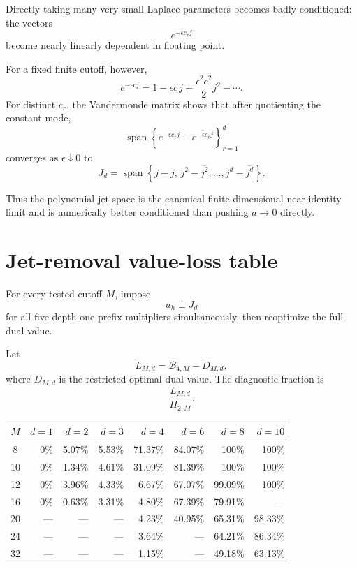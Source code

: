 \documentclass[11pt,a4paper]{article}
\newcommand{\Bcal}{\mathcal B}
\begin{document}
Directly taking many very small Laplace parameters becomes badly conditioned:
the vectors
\[
e^{-\epsilon c_r j}
\]
become nearly linearly dependent in floating point.

For a fixed finite cutoff, however,
\[
e^{-\epsilon c j}
=
1
-\epsilon c\,j
+\frac{\epsilon^2c^2}{2}j^2
-\cdots.
\]
For distinct \(c_r\), the Vandermonde matrix shows that after quotienting the
constant mode,
\[
\operatorname{span}
\left\{
e^{-\epsilon c_rj}-\overline{e^{-\epsilon c_rj}}
\right\}_{r=1}^d
\]
converges as \(\epsilon\downarrow0\) to
\[
\boxed{
J_d
=
\operatorname{span}
\left\{
j-\overline j,\,
j^2-\overline{j^2},\ldots,
j^d-\overline{j^d}
\right\}.
}
\tag{32}
\]

Thus the polynomial jet space is the canonical finite-dimensional
near-identity limit and is numerically better conditioned than pushing
\(a\to0\) directly.

\section{Jet-removal value-loss table}

For every tested cutoff \(M\), impose
\[
u_h\perp J_d
\]
for all five depth-one prefix multipliers simultaneously, then reoptimize the
full dual value.

Let
\[
L_{M,d}
=
\Bcal_{4,M}
-
D_{M,d},
\]
where \(D_{M,d}\) is the restricted optimal dual value.
The diagnostic fraction is
\[
\frac{L_{M,d}}{\Pi_{2,M}}.
\]

\begin{center}
\small
\begin{tabular}{c|rrrrrrr}
\toprule
\(M\) & \(d=1\) & \(d=2\) & \(d=3\) & \(d=4\) & \(d=6\) & \(d=8\) & \(d=10\)\\
\midrule
8  & 0\% & 5.07\% & 5.53\% & 71.37\% & 84.07\% & 100\% & 100\%\\
10 & 0\% & 1.34\% & 4.61\% & 31.09\% & 81.39\% & 100\% & 100\%\\
12 & 0\% & 3.96\% & 4.33\% & 6.67\% & 67.07\% & 99.09\% & 100\%\\
16 & 0\% & 0.63\% & 3.31\% & 4.80\% & 67.39\% & 79.91\% & ---\\
20 & --- & --- & --- & 4.23\% & 40.95\% & 65.31\% & 98.33\%\\
24 & --- & --- & --- & 3.64\% & --- & 64.21\% & 86.34\%\\
32 & --- & --- & --- & 1.15\% & --- & 49.18\% & 63.13\%\\
\bottomrule
\end{tabular}
\end{center}
\end{document}
